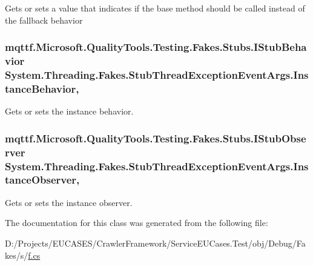Gets or sets a value that indicates if the base method should be called instead of the fallback behavior

\hypertarget{class_system_1_1_threading_1_1_fakes_1_1_stub_thread_exception_event_args_a3fdaca7183a39e55e2fbbbdf2e22c6ef}{
\subsubsection[{Instance\-Behavior}]{\setlength{\rightskip}{0pt plus 5cm}mqttf.\-Microsoft.\-Quality\-Tools.\-Testing.\-Fakes.\-Stubs.\-I\-Stub\-Behavior System.\-Threading.\-Fakes.\-Stub\-Thread\-Exception\-Event\-Args.\-Instance\-Behavior\hspace{0.3cm}{\ttfamily [get]}, {\ttfamily [set]}}}\label{class_system_1_1_threading_1_1_fakes_1_1_stub_thread_exception_event_args_a3fdaca7183a39e55e2fbbbdf2e22c6ef}


Gets or sets the instance behavior.

\hypertarget{class_system_1_1_threading_1_1_fakes_1_1_stub_thread_exception_event_args_a0f412220b811592d5be3be8f5c51d47c}{
\subsubsection[{Instance\-Observer}]{\setlength{\rightskip}{0pt plus 5cm}mqttf.\-Microsoft.\-Quality\-Tools.\-Testing.\-Fakes.\-Stubs.\-I\-Stub\-Observer System.\-Threading.\-Fakes.\-Stub\-Thread\-Exception\-Event\-Args.\-Instance\-Observer\hspace{0.3cm}{\ttfamily [get]}, {\ttfamily [set]}}}\label{class_system_1_1_threading_1_1_fakes_1_1_stub_thread_exception_event_args_a0f412220b811592d5be3be8f5c51d47c}


Gets or sets the instance observer.



The documentation for this class was generated from the following file\-:\begin{DoxyCompactItemize}
\item 
D\-:/\-Projects/\-E\-U\-C\-A\-S\-E\-S/\-Crawler\-Framework/\-Service\-E\-U\-Cases.\-Test/obj/\-Debug/\-Fakes/s/\hyperlink{s_2f_8cs}{f.\-cs}\end{DoxyCompactItemize}
